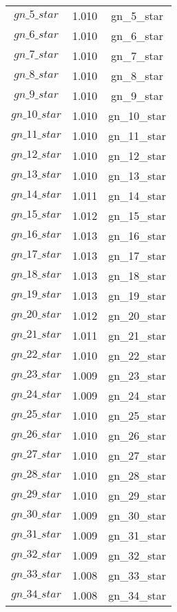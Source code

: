 \begin{center}
\begin{longtable}{ccc}
$gn\_5\_star$ 	 & 	 1.010 	 & 	 gn\_5\_star\\
$gn\_6\_star$ 	 & 	 1.010 	 & 	 gn\_6\_star\\
$gn\_7\_star$ 	 & 	 1.010 	 & 	 gn\_7\_star\\
$gn\_8\_star$ 	 & 	 1.010 	 & 	 gn\_8\_star\\
$gn\_9\_star$ 	 & 	 1.010 	 & 	 gn\_9\_star\\
$gn\_10\_star$ 	 & 	 1.010 	 & 	 gn\_10\_star\\
$gn\_11\_star$ 	 & 	 1.010 	 & 	 gn\_11\_star\\
$gn\_12\_star$ 	 & 	 1.010 	 & 	 gn\_12\_star\\
$gn\_13\_star$ 	 & 	 1.010 	 & 	 gn\_13\_star\\
$gn\_14\_star$ 	 & 	 1.011 	 & 	 gn\_14\_star\\
$gn\_15\_star$ 	 & 	 1.012 	 & 	 gn\_15\_star\\
$gn\_16\_star$ 	 & 	 1.013 	 & 	 gn\_16\_star\\
$gn\_17\_star$ 	 & 	 1.013 	 & 	 gn\_17\_star\\
$gn\_18\_star$ 	 & 	 1.013 	 & 	 gn\_18\_star\\
$gn\_19\_star$ 	 & 	 1.013 	 & 	 gn\_19\_star\\
$gn\_20\_star$ 	 & 	 1.012 	 & 	 gn\_20\_star\\
$gn\_21\_star$ 	 & 	 1.011 	 & 	 gn\_21\_star\\
$gn\_22\_star$ 	 & 	 1.010 	 & 	 gn\_22\_star\\
$gn\_23\_star$ 	 & 	 1.009 	 & 	 gn\_23\_star\\
$gn\_24\_star$ 	 & 	 1.009 	 & 	 gn\_24\_star\\
$gn\_25\_star$ 	 & 	 1.010 	 & 	 gn\_25\_star\\
$gn\_26\_star$ 	 & 	 1.010 	 & 	 gn\_26\_star\\
$gn\_27\_star$ 	 & 	 1.010 	 & 	 gn\_27\_star\\
$gn\_28\_star$ 	 & 	 1.010 	 & 	 gn\_28\_star\\
$gn\_29\_star$ 	 & 	 1.010 	 & 	 gn\_29\_star\\
$gn\_30\_star$ 	 & 	 1.009 	 & 	 gn\_30\_star\\
$gn\_31\_star$ 	 & 	 1.009 	 & 	 gn\_31\_star\\
$gn\_32\_star$ 	 & 	 1.009 	 & 	 gn\_32\_star\\
$gn\_33\_star$ 	 & 	 1.008 	 & 	 gn\_33\_star\\
$gn\_34\_star$ 	 & 	 1.008 	 & 	 gn\_34\_star\\

\end{longtable}
\end{center}

